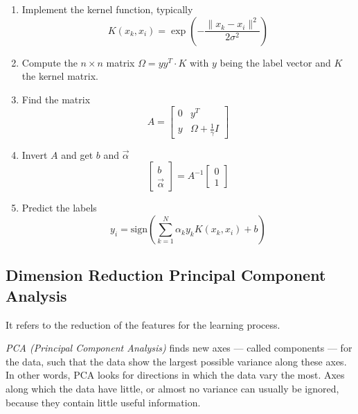\begin{enumerate}

    \item Implement the kernel function, typically 
    \[
        K(x_k, x_i) = \exp\left(- \frac{\|x_k - x_i\|^2}{2\sigma^2}\right)
    \]

    \item Compute the \(n \times n\) matrix \(\Omega = yy^T \cdot K\) with \(y\) being the label vector and \(K\) the  
    kernel matrix.

    \item Find the matrix   
    \[
        A = 
        \begin{bmatrix}
            0 & y^T \\ 
            y & \Omega + \frac{1}{\gamma} I
        \end{bmatrix} 
    \]

    \item Invert \(A\) and get \(b\) and \(\vec{\alpha}\)     
    \[
        \begin{bmatrix}
            b \\ 
            \vec{\alpha}
        \end{bmatrix}
        = 
        A^{-1} 
        \begin{bmatrix}  0  \\ 1 \end{bmatrix}
    \]

    \item Predict the labels 
    \[
        y_i = \mathrm{sign}\left(\sum_{k = 1}^{N} \alpha_k y_k K(x_k, x_i) + b\right)
    \]

   

\end{enumerate}

\subsection{Dimension Reduction Principal Component Analysis}

It refers to the reduction of the features for the learning process.

\emph{PCA (Principal Component Analysis)} finds new axes — called components — for the data, such that the data show the largest possible variance along these axes.
In other words, PCA looks for directions in which the data vary the most.
Axes along which the data have little, or almost no variance can usually be ignored, because they contain little useful information.

